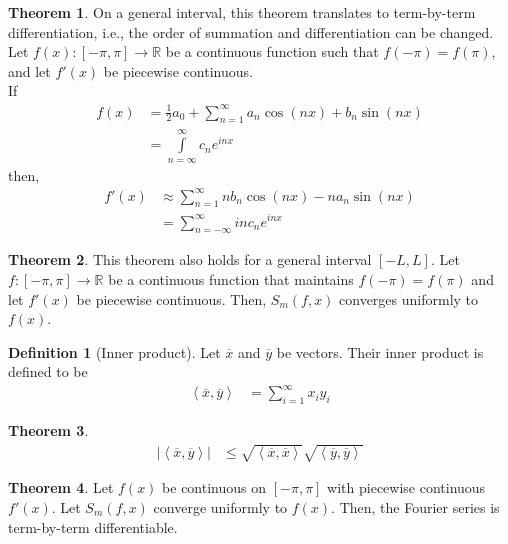 \documentclass[fleqn, a4paper, 12pt, twoside]{article}
\theoremstyle{definition}
\newtheorem{definition}{Definition}
\theoremstyle{theorem}
\newtheorem{theorem}{Theorem}
\begin{document}
\begin{theorem}
	\marginnote
	{
		On a general interval, this theorem translates to term-by-term differentiation, i.e., the order of summation and differentiation can be changed.
	}
	Let $f(x) : [-\pi,\pi] \to \mathbb{R}$ be a continuous function such that $f(-\pi) = f(\pi)$, and let $f'(x)$ be piecewise continuous.\\
	If
	\begin{align*}
		f(x) &= \frac{1}{2} a_0 + \sum\limits_{n = 1}^{\infty} a_n \cos(n x) + b_n \sin(n x)\\
		&= \int\limits_{n = \infty}^{\infty} c_n e^{i n x}
	\end{align*}
	then,
	\begin{align*}
		f'(x) &\approx \sum\limits_{n = 1}^{\infty} n b_n \cos(n x) - n a_n \sin(n x)\\
		&= \sum\limits_{n = -\infty}^{\infty} i n c_n e^{i n x}
	\end{align*}
\end{theorem}

\begin{theorem}
	\marginnote
	{
		This theorem also holds for a general interval $[-L,L]$.
	}
	Let $f : [-\pi,\pi] \to \mathbb{R}$ be a continuous function that maintains $f(-\pi) = f(\pi)$ and let $f'(x)$ be piecewise continuous.
	Then, $S_m(f,x)$ converges uniformly to $f(x)$.
\end{theorem}

\begin{definition}[Inner product]
	Let $\overline{x}$ and $\overline{y}$ be vectors.
	Their inner product is defined to be
	\begin{align*}
		\left\langle \overline{x} , \overline{y} \right\rangle &= \sum\limits_{i = 1}^{\infty} x_i y_i
	\end{align*}
\end{definition}

\begin{theorem}
	\begin{align*}
		\left| \left\langle \overline{x} , \overline{y} \right\rangle \right| &\le \sqrt{\left\langle \overline{x} , \overline{x} \right\rangle} \sqrt{\left\langle \overline{y} , \overline{y} \right\rangle}
	\end{align*}
\end{theorem}

\begin{theorem}
	Let $f(x)$ be continuous on $[-\pi,\pi]$ with piecewise continuous $f'(x)$.
	Let $S_m(f,x)$ converge uniformly to $f(x)$.
	Then, the Fourier series is term-by-term differentiable.
\end{theorem}
\end{document}
